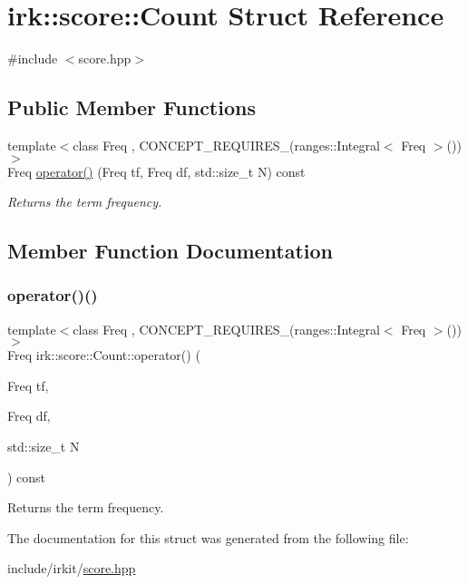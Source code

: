 \hypertarget{structirk_1_1score_1_1Count}{}\section{irk\+:\+:score\+:\+:Count Struct Reference}
\label{structirk_1_1score_1_1Count}


{\ttfamily \#include $<$score.\+hpp$>$}

\subsection*{Public Member Functions}
\begin{DoxyCompactItemize}
\item 
{\footnotesize template$<$class Freq , C\+O\+N\+C\+E\+P\+T\+\_\+\+R\+E\+Q\+U\+I\+R\+E\+S\+\_\+(ranges\+::\+Integral$<$ Freq $>$()) $>$ }\\Freq \mbox{\hyperlink{structirk_1_1score_1_1Count_abb572ea924abdbd1ae7655d7cb6d5212}{operator()}} (Freq tf, Freq df, std\+::size\+\_\+t N) const
\begin{DoxyCompactList}\small\item\em Returns the term frequency. \end{DoxyCompactList}\end{DoxyCompactItemize}


\subsection{Member Function Documentation}
\mbox{\label{structirk_1_1score_1_1Count_abb572ea924abdbd1ae7655d7cb6d5212}} 
\subsubsection{\texorpdfstring{operator()()}{operator()()}}
{\footnotesize\ttfamily template$<$class Freq , C\+O\+N\+C\+E\+P\+T\+\_\+\+R\+E\+Q\+U\+I\+R\+E\+S\+\_\+(ranges\+::\+Integral$<$ Freq $>$()) $>$ \\
Freq irk\+::score\+::\+Count\+::operator() (\begin{DoxyParamCaption}\item[{Freq}]{tf,  }\item[{Freq}]{df,  }\item[{std\+::size\+\_\+t}]{N }\end{DoxyParamCaption}) const\hspace{0.3cm}{\ttfamily [inline]}}



Returns the term frequency. 



The documentation for this struct was generated from the following file\+:\begin{DoxyCompactItemize}
\item 
include/irkit/\mbox{\hyperlink{score_8hpp}{score.\+hpp}}\end{DoxyCompactItemize}
